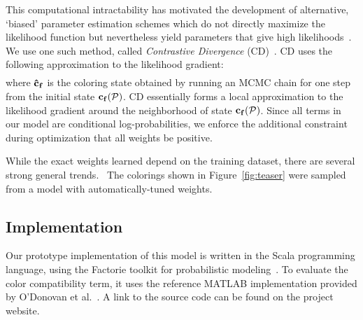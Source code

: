 This computational intractability has motivated the development of alternative, `biased' parameter estimation schemes which do not directly maximize the likelihood function but nevertheless yield parameters that give high likelihoods~\cite{NonMLEParameterEstimation}. We use one such method, called \emph{Contrastive Divergence} (CD)~\cite{ContrastiveDivergence}. CD uses the following approximation to the likelihood gradient:
\begin{multline*}
\end{multline*}
where $\mathbf{\hat{c}_f}$ is the coloring state obtained by running an MCMC chain for one step from the initial state $\mathbf{c_f}(\mathcal{P})$. CD essentially forms a local approximation to the likelihood gradient around the neighborhood of state $\mathbf{c_f}(\mathcal{P})$. Since all terms in our model are conditional log-probabilities, we enforce the additional constraint during optimization that all weights be positive.~

While the exact weights learned depend on the training dataset, there are several strong general trends.~ The colorings shown in Figure~\ref{fig:teaser} were sampled from a model with automatically-tuned weights.

\subsection{Implementation}
\label{sec:implementation}

Our prototype implementation of this model is written in the Scala programming language, using the Factorie toolkit for probabilistic modeling~\cite{Factorie}. To evaluate the color compatibility term, it uses the reference MATLAB implementation provided by O'Donovan et al.~. A link to the source code can be found on the project website.